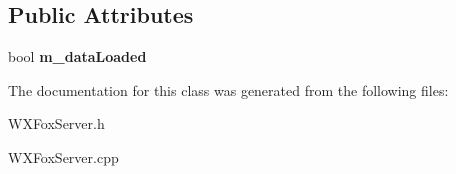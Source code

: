 \subsection*{Public Attributes}
\begin{DoxyCompactItemize}
\item 
\mbox{\label{class_w_x_fox_server_a7734bd338bd7d27affca93826fc520b4}} 
bool {\bfseries m\+\_\+data\+Loaded}
\end{DoxyCompactItemize}


The documentation for this class was generated from the following files\+:\begin{DoxyCompactItemize}
\item 
W\+X\+Fox\+Server.\+h\item 
W\+X\+Fox\+Server.\+cpp\end{DoxyCompactItemize}
